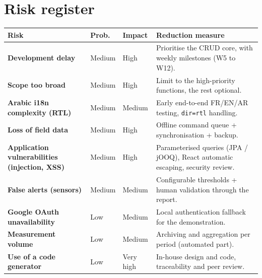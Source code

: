 \section{Risk register}
\begin{xltabular}{\textwidth}{>{\bfseries}p{4.6cm} C{1.8cm} C{1.6cm} X}
\toprule
\textbf{Risk} & \textbf{Prob.} & \textbf{Impact} & \textbf{Reduction measure} \\
\midrule
\endhead
Development delay             & Medium & High      & Prioritise the CRUD core, with weekly milestones (W5 to W12). \\
Scope too broad               & Medium & High      & Limit to the high-priority functions, the rest optional. \\
Arabic i18n complexity (RTL)  & Medium & Medium    & Early end-to-end FR/EN/AR testing, \texttt{dir=rtl} handling. \\
Loss of field data            & Medium & High      & Offline command queue + synchronisation + backup. \\
Application vulnerabilities (injection, XSS) & Medium & High & Parameterised queries (JPA / jOOQ), React automatic escaping, security review. \\
False alerts (sensors)        & Medium & Medium    & Configurable thresholds + human validation through the report. \\
Google OAuth unavailability   & Low    & Medium    & Local authentication fallback for the demonstration. \\
Measurement volume            & Low    & Medium    & Archiving and aggregation per period (automated part). \\
Use of a code generator       & Low    & Very high & In-house design and code, traceability and peer review. \\
\bottomrule
\end{xltabular}

